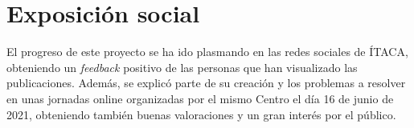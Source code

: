 \section{Exposición social}

El progreso de este proyecto se ha ido plasmando en las redes sociales de ÍTACA, obteniendo un \textit{feedback} positivo de las personas que han visualizado las publicaciones. Además, se explicó parte de su creación y los problemas a resolver en unas jornadas online organizadas por el mismo Centro el día 16 de junio de 2021, obteniendo también buenas valoraciones y un gran interés por el público.